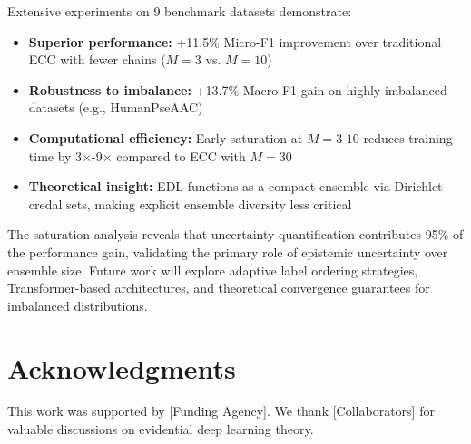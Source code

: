 \documentclass[conference]{IEEEtran}
\begin{document}
Extensive experiments on 9 benchmark datasets demonstrate:
\begin{itemize}
    \item \textbf{Superior performance:} +11.5\% Micro-F1 improvement over traditional ECC with fewer chains ($M=3$ vs. $M=10$)
    \item \textbf{Robustness to imbalance:} +13.7\% Macro-F1 gain on highly imbalanced datasets (e.g., HumanPseAAC)
    \item \textbf{Computational efficiency:} Early saturation at $M=3$-$10$ reduces training time by 3$\times$-9$\times$ compared to ECC with $M=30$
    \item \textbf{Theoretical insight:} EDL functions as a compact ensemble via Dirichlet credal sets, making explicit ensemble diversity less critical
\end{itemize}

The saturation analysis reveals that uncertainty quantification contributes 95\% of the performance gain, validating the primary role of epistemic uncertainty over ensemble size. Future work will explore adaptive label ordering strategies, Transformer-based architectures, and theoretical convergence guarantees for imbalanced distributions.

\section*{Acknowledgments}
This work was supported by [Funding Agency]. We thank [Collaborators] for valuable discussions on evidential deep learning theory.
\end{document}
